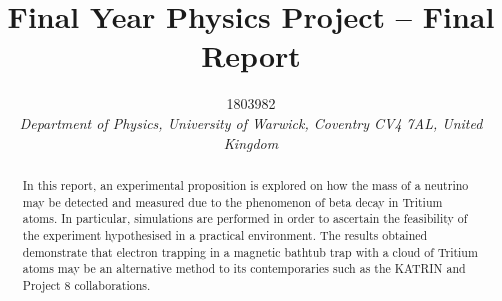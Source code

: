 \documentclass[a4paper,12pt, notitlepage]{article}
\begin{document}
\title{\textbf{\large{Final Year Physics Project – Final Report}}}

\author{\normalsize{1803982} \\
        \small\textit{
        Department of Physics, University of Warwick,
        Coventry CV4 7AL, United Kingdom}}
\date{}
\maketitle
\vspace{-10mm}

\begin{abstract} 
\noindent
In this report, an experimental proposition is explored on how the mass of a neutrino may be detected and measured due to the phenomenon of beta decay in Tritium atoms. In particular, simulations are performed in order to ascertain the feasibility of the experiment hypothesised in a practical environment. The results obtained demonstrate that electron trapping in a magnetic bathtub trap with a cloud of Tritium atoms may be an alternative method to its contemporaries such as the KATRIN and Project 8 collaborations.
\end{abstract}
\vspace{6mm}
\end{document}

